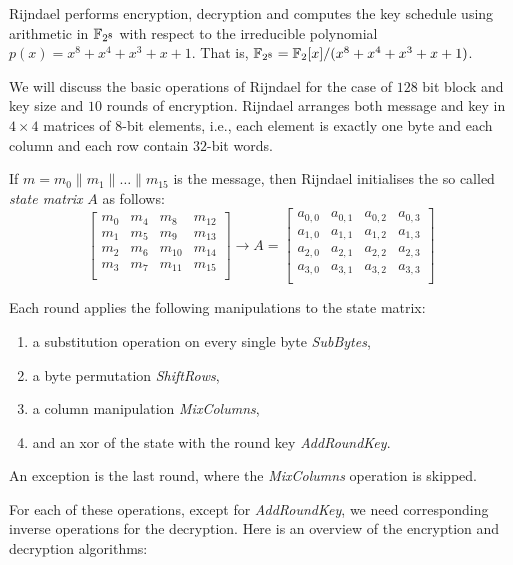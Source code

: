 Rijndael performs encryption, decryption and computes the key schedule using
arithmetic in $\mathbb{F}_{2^8}$ with respect to the irreducible polynomial
$p(x)=x^8+x^4+x^3+x+1$. That is, $\mathbb{F}_{2^8}=\mathbb{F}_{2}[x]/(x^8+x^4+x^3+x+1)$.


We will discuss the basic operations of Rijndael for the case of $128$ bit block
and key size and $10$ rounds of encryption. Rijndael arranges both message and
key in $4\times4$ matrices of $8$-bit elements, i.e., each element is exactly
one byte and each column and each row contain $32$-bit words. 

If $m=m_0\|m_1\|\ldots\|m_{15}$ is the message, then Rijndael initialises the so
called \emph{state matrix} $A$ as follows:
\[
\begin{bmatrix}
  m_0 & m_4 & m_8 & m_{12}\\
  m_1 & m_5 & m_9 & m_{13}\\
  m_2 & m_6 & m_{10} & m_{14}\\
  m_3 & m_7 & m_{11} & m_{15}\\
\end{bmatrix}\longrightarrow
A=
\begin{bmatrix}
  a_{0,0} & a_{0,1} & a_{0,2} & a_{0,3}\\
  a_{1,0} & a_{1,1} & a_{1,2} & a_{1,3}\\
  a_{2,0} & a_{2,1} & a_{2,2} & a_{2,3}\\
  a_{3,0} & a_{3,1} & a_{3,2} & a_{3,3}\\
\end{bmatrix}
\]

Each round applies the following manipulations to the state matrix:
\begin{enumerate}
\item a substitution operation on every single byte \textit{SubBytes},
\item a byte permutation \textit{ShiftRows},
\item a column manipulation \textit{MixColumns},
\item and an xor of the state with the round key \textit{AddRoundKey}.
\end{enumerate}
An exception is the last round, where the \textit{MixColumns} operation is
skipped. 

For each of these operations, except for \textit{AddRoundKey}, we need
corresponding inverse operations for the decryption. Here is an overview of the
encryption and decryption algorithms:

